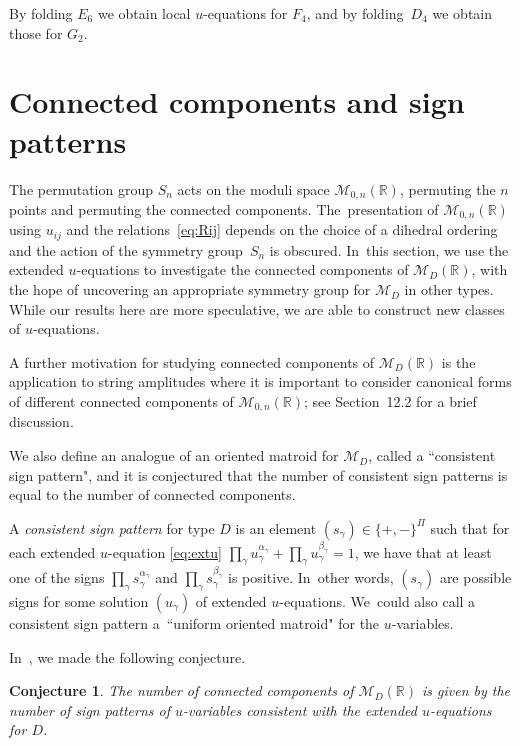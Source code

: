 \documentclass[pdftex]{sigma}%
\def\R{{\mathbb R}}
\def\M{{\mathcal{M}}}
\numberwithin{equation}{section}
\newtheorem{Conjecture}[Theorem]{Conjecture}
 { \theoremstyle{definition}
\newtheorem{Definition}[Theorem]{Definition}
\newtheorem{Example}[Theorem]{Example}
\newtheorem{Remark}[Theorem]{Remark}
\newtheorem{question}[Theorem]{Question}
\newtheorem{problem}[Theorem]{Problem}}
\begin{document}
\medskip{} By folding $E_6$ we obtain local $u$-equations for $F_4$, and by folding~$D_4$ we obtain those for $G_2$.

\section{Connected components and sign patterns} \label{sec:conn}

The permutation group $S_n$ acts on the moduli space $\M_{0,n}(\R)$, permuting the $n$ points and permuting the connected components. The~presentation of $\M_{0,n}(\R)$ using $u_{ij}$ and the relations~\eqref{eq:Rij} depends on the choice of a dihedral ordering and the action of the symmetry group~$S_n$ is obscured. In~this section, we use the extended $u$-equations to investigate the connected components of $\M_D(\R)$, with the hope of uncovering an appropriate symmetry group for $\M_D$ in other types. While our results here are more speculative, we are able to construct new classes of $u$-equations.

A further motivation for studying connected components of $\M_D(\R)$ is the application to string amplitudes where it is important to consider canonical forms of different connected components of $\M_{0,n}(\R)$; see Section~12.2 for a brief discussion.

We also define an analogue of an oriented matroid for $\M_D$, called a ``consistent sign pattern", and it is conjectured that the number of consistent sign patterns is equal to the number of connected components.

\bigskip{}
A \emph{consistent sign pattern} for type $D$ is an element $(s_\gamma) \in \{+,-\}^\Pi$ such that for each extended $u$-equation \eqref{eq:extu} $\prod_\gamma u_\gamma^{\alpha_\gamma} + \prod_\gamma u_\gamma^{\beta_\gamma} =1$, we have that at least one of the signs $\prod_\gamma s_\gamma^{\alpha_\gamma}$ and $\prod_\gamma s_\gamma^{\beta_\gamma}$ is positive. In~other words, $(s_\gamma)$ are possible signs for some solution $(u_\gamma)$ of extended $u$-equations. We~could also call a consistent sign pattern a~``uniform oriented matroid" for the $u$-variables.

In~\cite{AHLT}, we made the following conjecture.

\begin{Conjecture} The number of connected components of $\M_D(\R)$ is given by the number of sign patterns of $u$-variables consistent with the extended $u$-equations for $D$.
\end{Conjecture}
\end{document}
